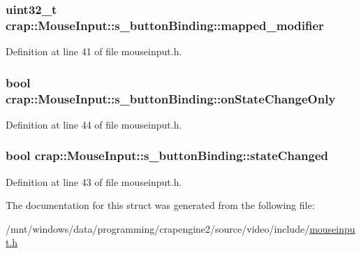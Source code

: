 \subsubsection[{mapped\+\_\+modifier}]{\setlength{\rightskip}{0pt plus 5cm}uint32\+\_\+t crap\+::\+Mouse\+Input\+::s\+\_\+button\+Binding\+::mapped\+\_\+modifier}\label{structcrap_1_1_mouse_input_1_1s__button_binding_a7828977e7c16c4c4a8df06aa0c7f6491}


Definition at line 41 of file mouseinput.\+h.

\hypertarget{structcrap_1_1_mouse_input_1_1s__button_binding_a2239fa91c7d78365c32be0148dddabcf}{}
\subsubsection[{on\+State\+Change\+Only}]{\setlength{\rightskip}{0pt plus 5cm}bool crap\+::\+Mouse\+Input\+::s\+\_\+button\+Binding\+::on\+State\+Change\+Only}\label{structcrap_1_1_mouse_input_1_1s__button_binding_a2239fa91c7d78365c32be0148dddabcf}


Definition at line 44 of file mouseinput.\+h.

\hypertarget{structcrap_1_1_mouse_input_1_1s__button_binding_ada0af7c411ba694b177864d3b617771c}{}
\subsubsection[{state\+Changed}]{\setlength{\rightskip}{0pt plus 5cm}bool crap\+::\+Mouse\+Input\+::s\+\_\+button\+Binding\+::state\+Changed}\label{structcrap_1_1_mouse_input_1_1s__button_binding_ada0af7c411ba694b177864d3b617771c}


Definition at line 43 of file mouseinput.\+h.



The documentation for this struct was generated from the following file\+:\begin{DoxyCompactItemize}
\item 
/mnt/windows/data/programming/crapengine2/source/video/include/\hyperlink{mouseinput_8h}{mouseinput.\+h}\end{DoxyCompactItemize}
